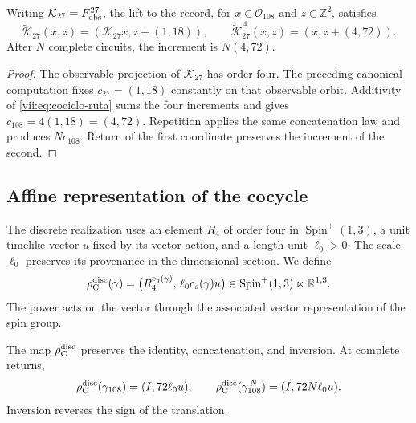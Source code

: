 \begin{proposition}
\label{vii:prop:memoria-vuelta-completa}
Writing \(\mathcal K_{27}=F_{\rm obs}^{27}\), the lift
to the record, for \(x\in\mathcal O_{108}\) and \(z\in\mathbb Z^2\), satisfies
\[
 \widetilde{\mathcal K}_{27}(x,z)
   =(\mathcal K_{27}x,z+(1,18)),\qquad
 \widetilde{\mathcal K}_{27}^{\,4}(x,z)
   =(x,z+(4,72)).
\]
After \(N\) complete circuits, the increment is \(N(4,72)\).
\end{proposition}

\begin{proof}
The observable projection of \(\mathcal K_{27}\) has order four.
The preceding canonical computation fixes \(c_{27}=(1,18)\) constantly
on that observable orbit. Additivity of
\eqref{vii:eq:cociclo-ruta} sums the four increments and gives
\(c_{108}=4(1,18)=(4,72)\).
Repetition applies the same concatenation law and produces
\(Nc_{108}\). Return of the first coordinate preserves the
increment of the second.
\end{proof}

\subsection{Affine representation of the cocycle}
\label{vii:subsec:representacion-afin-cociclo}

The discrete realization uses an element \(R_4\) of order four in
\(\operatorname{Spin}^+(1,3)\), a unit timelike vector \(u\)
fixed by its vector action, and a length unit \(\ell_0>0\).
The scale \(\ell_0\) preserves its provenance in the dimensional section.
We define
\begin{equation}
 \rho_{\rm C}^{\rm disc}(\gamma)=
 \bigl(R_4^{c_g(\gamma)},\,\ell_0c_s(\gamma)u\bigr)
 \in\operatorname{Spin}^+(1,3)\ltimes\mathbb R^{1,3}.
 \label{vii:eq:representacion-discreta-memoria}
\end{equation}
The power acts on the vector through the associated vector
representation of the spin group.

\begin{theorem}
\label{vii:thm:traslacion-memoria}
The map \(\rho_{\rm C}^{\rm disc}\) preserves the identity,
concatenation, and inversion. At complete returns,
\begin{equation}
 \rho_{\rm C}^{\rm disc}(\gamma_{108})=(I,72\ell_0u),\qquad
 \rho_{\rm C}^{\rm disc}(\gamma_{108}^{\,N})=(I,72N\ell_0u).
 \label{vii:eq:traslacion-retorno-108}
\end{equation}
Inversion reverses the sign of the translation.
\end{theorem}

